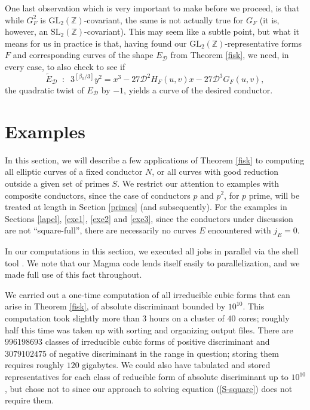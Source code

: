 One last observation which is very important to make before we proceed, is that while $G_F^2$ is $\mbox{GL}_2(\mathbb{Z})$-covariant, the same is not actually true for $G_F$ (it is, however, an $\mbox{SL}_2(\mathbb{Z})$-covariant). This may seem like a subtle point, but what it means for us in practice is that, having found our $\mbox{GL}_2(\mathbb{Z})$-representative forms $F$ and corresponding curves of the shape $E_{\mathcal{D}}$ from Theorem \ref{fisk}, we need, in every case, to also check to see if  
$$
\tilde{E}_{\mathcal{D}} \; \; : \; \; 3^{[\beta_0/3]} y^2 = x^3 -27 \mathcal{D} ^2 H_F(u,v) x -27 \mathcal{D} ^3 G_F(u,v),
$$
the quadratic twist of $E_{\mathcal{D}}$ by $-1$, yields a curve of the desired conductor.

\section{Examples}\label{examples}

In this section, we will describe a few applications of Theorem \ref{fisk} to computing all elliptic curves of a fixed conductor $N$, or all curves with good reduction outside
a given set of primes $S$. We restrict our attention to examples with composite conductors, since the case of conductors $p$ and $p^2$, for $p$ prime, 
will be treated at length in Section \ref{primes} (and subsequently). For the examples in Sections \ref{lapel}, \ref{exe1}, \ref{exe2} and \ref{exe3}, since the conductors under discussion are not ``square-full'', there are necessarily no curves $E$ encountered with $j_E=0$.

In our computations in this section, we executed all jobs in parallel via the shell tool \cite{Tange2011a}. We note that our Magma code lends itself easily to parallelization, and we made full use of this fact throughout.

We carried out a one-time computation of all irreducible cubic forms that can arise in Theorem \ref{fisk}, of absolute discriminant bounded by $10^{10}$. This computation took slightly more than $3$ hours on a cluster of $40$ cores; roughly half this time was taken up with sorting and organizing output files.  There are $996198693$  classes of  irreducible cubic forms of positive discriminant and $3079102475$ of negative discriminant in the range in question; storing them requires roughly $120$ gigabytes. We could also have tabulated and stored representatives for each class of reducible form of absolute discriminant up to $10^{10}$, but chose not to since our approach to solving equation (\ref{S-square}) does not require them.

